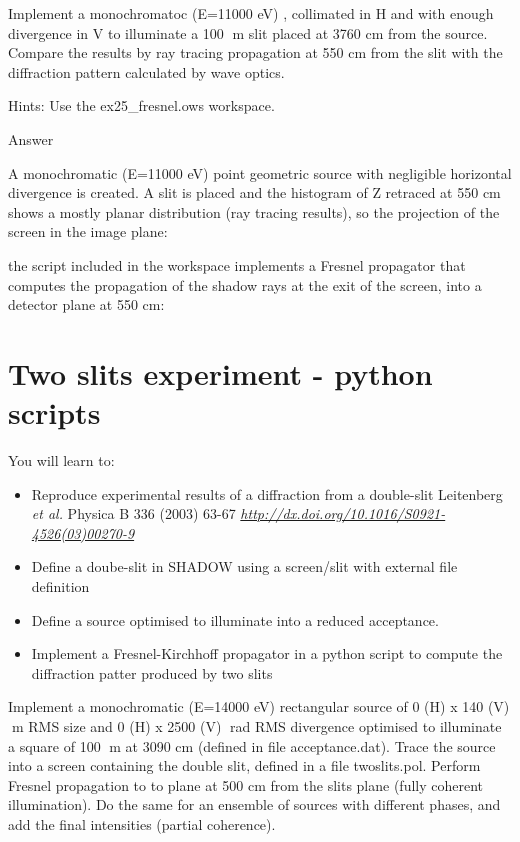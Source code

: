 \documentclass[]{article}
\begin{document}
Implement a monochromatoc (E=11000 eV) , collimated in H and with enough
divergence in V to illuminate a 100 m slit placed at 3760 cm from the
source. Compare the results by ray tracing propagation at 550 cm from
the slit with the diffraction pattern calculated by wave optics.

Hints: Use the ex25\_fresnel.ows workspace.

Answer

A monochromatic (E=11000 eV) point geometric source with negligible
horizontal divergence is created. A slit is placed and the histogram of
Z retraced at 550 cm shows a mostly planar distribution (ray tracing
results), so the projection of the screen in the image plane:

the script included in the workspace implements a Fresnel propagator
that computes the propagation of the shadow rays at the exit of the
screen, into a detector plane at 550 cm:

\section{Two slits experiment - python
scripts}\label{two-slits-experiment---python-scripts}

You will learn to:

\begin{itemize}
\item
  Reproduce experimental results of a diffraction from a double-slit
  Leitenberg \emph{et al.} Physica B 336 (2003) 63-67
  \href{http://dx.doi.org/10.1016/S0921-4526(03)00270-9}{\emph{\emph{http://dx.doi.org/10.1016/S0921-4526(03)00270-9}}}
\item
  Define a doube-slit in SHADOW using a screen/slit with external file
  definition
\item
  Define a source optimised to illuminate into a reduced acceptance.
\item
  Implement a Fresnel-Kirchhoff propagator in a python script to compute
  the diffraction patter produced by two slits
\end{itemize}

Implement a monochromatic (E=14000 eV) rectangular source of 0 (H) x 140
(V) m RMS size and 0 (H) x 2500 (V) rad RMS divergence optimised to
illuminate a square of 100 m at 3090 cm (defined in file
acceptance.dat). Trace the source into a screen containing the double
slit, defined in a file twoslits.pol. Perform Fresnel propagation to to
plane at 500 cm from the slits plane (fully coherent illumination). Do
the same for an ensemble of sources with different phases, and add the
final intensities (partial coherence).
\end{document}
